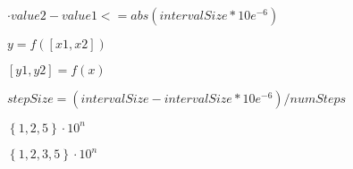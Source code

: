 \documentclass{article}
\begin{document}
$\cdot value2 - value1 <= abs(intervalSize * 10e^{-6})$
\pagebreak

$y = f([x1,x2])$
\pagebreak

$[y1,y2] = f(x)$
\pagebreak

$stepSize = (intervalSize - intervalSize * 10e^{-6}) / numSteps$
\pagebreak

$\left\{ 1,2,5\right\} \cdot 10^{n}$
\pagebreak

$\left\{ 1,2,3,5\right\} \cdot 10^{n}$
\pagebreak
\end{document}
